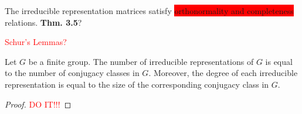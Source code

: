 \begin{example}

\end{example}

The irreducible representation matrices satisfy \colorbox{red}{orthonormality and completeness} relations.\textbf{ Thm. 3.5}?

\textcolor{red}{Schur's Lemmas?}

\begin{theorem}\label{th:irred}
    Let $G$ be a finite group. The number of irreducible representations of $G$ is equal to the number of conjugacy classes in $G$. Moreover, the degree of each irreducible representation is equal to the size of the corresponding conjugacy class in $G$.
\end{theorem}
\begin{proof}
    \textcolor{red}{DO IT!!!}
\end{proof}

